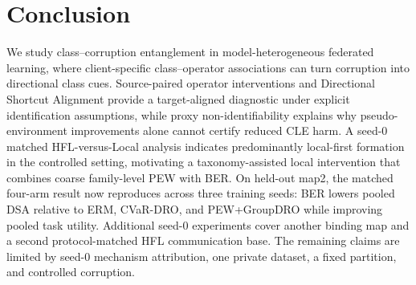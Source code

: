 \section{Conclusion}

We study class--corruption entanglement in model-heterogeneous federated learning, where client-specific class--operator associations can turn corruption into directional class cues. Source-paired operator interventions and Directional Shortcut Alignment provide a target-aligned diagnostic under explicit identification assumptions, while proxy non-identifiability explains why pseudo-environment improvements alone cannot certify reduced CLE harm. A seed-0 matched HFL-versus-Local analysis indicates predominantly local-first formation in the controlled setting, motivating a taxonomy-assisted local intervention that combines coarse family-level PEW with BER. On held-out map2, the matched four-arm result now reproduces across three training seeds: BER lowers pooled DSA relative to ERM, CVaR-DRO, and PEW+GroupDRO while improving pooled task utility. Additional seed-0 experiments cover another binding map and a second protocol-matched HFL communication base. The remaining claims are limited by seed-0 mechanism attribution, one private dataset, a fixed partition, and controlled corruption.

